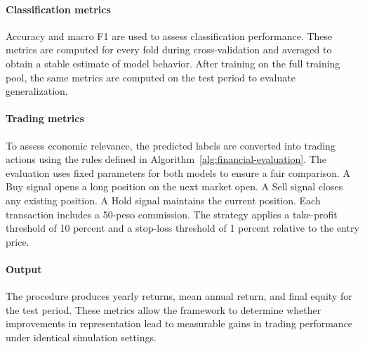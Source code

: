 \paragraph{Classification metrics}

Accuracy and macro F1 are used to assess classification performance. These metrics are computed for every fold during cross-validation and averaged to obtain a stable estimate of model behavior. After training on the full training pool, the same metrics are computed on the test period to evaluate generalization.


\paragraph{Trading metrics}

To assess economic relevance, the predicted labels are converted into trading actions using the rules defined in Algorithm~\ref{alg:financial-evaluation}. The evaluation uses fixed parameters for both models to ensure a fair comparison. A Buy signal opens a long position on the next market open. A Sell signal closes any existing position. A Hold signal maintains the current position. Each transaction includes a 50-peso commission. The strategy applies a take-profit threshold of 10 percent and a stop-loss threshold of 1 percent relative to the entry price.

\paragraph{Output}

The procedure produces yearly returns, mean annual return, and final equity for the test period. These metrics allow the framework to determine whether improvements in representation lead to measurable gains in trading performance under identical simulation settings.

